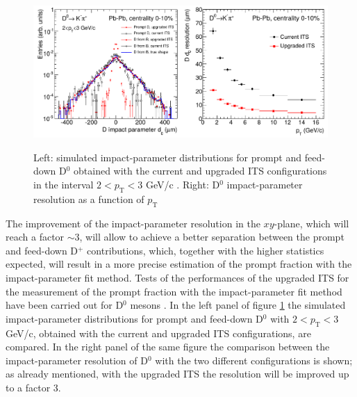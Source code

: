\documentclass[b5paper,10pt,twoside,oldstyle,classica]{toptesi}
\newcommand{\pt}{p_\text{T}}
\begin{document}
\begin{figure}[tb]
\begin{center}
{\includegraphics[scale = 0.35]{Dmesons_ITSupgrade.png}}
\caption{Left: simulated impact-parameter distributions for prompt and feed-down D$^0$ obtained with the current and upgraded ITS configurations in the interval $2<\pt<3$ GeV/c \cite{Abelevetal:2014dna}. Right: D$^0$ impact-parameter resolution as a function of $\pt$}
\label{Dmesons_upgradedITS}
\end{center}
\end{figure} The improvement of the impact-parameter resolution in the $xy$-plane, which will reach a factor $\sim 3$, will allow to achieve a better separation between the prompt and feed-down D$^+$ contributions, which, together with the higher statistics expected, will result in a more precise estimation of the prompt fraction with the impact-parameter fit method. Tests of the performances of the upgraded ITS for the measurement of the prompt fraction with the impact-parameter fit method have been carried out for D$^0$ mesons \cite{Abelevetal:2014dna}. In the left panel of figure \ref{Dmesons_upgradedITS} the simulated impact-parameter distributions for prompt and feed-down D$^0$ with $2<\pt<3$ GeV/c, obtained with the current and upgraded ITS configurations, are compared. In the right panel of the same figure the comparison between the impact-parameter resolution of D$^0$ with the two different configurations is shown; as already mentioned, with the upgraded ITS the resolution will be improved up to a factor 3. 
\end{document}
